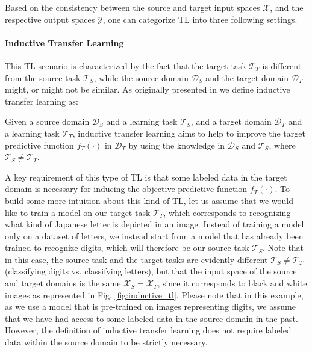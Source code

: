 Based on the consistency between the source and target input spaces $\mathcal{X}$, and the respective output spaces $\mathcal{Y}$, one can categorize TL into three following settings.

\paragraph{\textbf{\uppercase{I}nductive \uppercase{T}ransfer \uppercase{L}earning}}
This TL scenario is characterized by the fact that the target task $\mathcal{T}_T$ is different from the source task $\mathcal{T}_S$, while the source domain $\mathcal{D}_S$ and the target domain $\mathcal{D}_T$ might, or might not be similar. As originally presented in \cite{pan2009survey} we define inductive transfer learning as:
\begin{definition}
	Given a source domain $\mathcal{D}_S$ and a learning task $\mathcal{T}_S$, and a target domain $\mathcal{D}_T$ and a learning task $\mathcal{T}_T$, inductive transfer learning aims to help to improve the target predictive function $f_T(\cdot)$ in $\mathcal{D}_T$ by using the knowledge in $\mathcal{D}_S$ and $\mathcal{T}_S$, where $\mathcal{T}_S \neq \mathcal{T}_T$. 
\end{definition}
A key requirement of this type of TL is that some labeled data in the target domain is necessary for inducing the objective predictive function $f_T(\cdot)$. To build some more intuition about this kind of TL, let us assume that we would like to train a model on our target task $\mathcal{T}_T$, which corresponds to recognizing what kind of Japanese letter is depicted in an image. Instead of training a model only on a dataset of letters, we instead start from a model that has already been trained to recognize digits, which will therefore be our source task $\mathcal{T}_S$. Note that in this case, the source task and the target tasks are evidently different $\mathcal{T}_S \neq \mathcal{T}_T$ (classifying digits vs. classifying letters), but that the input space of the source and target domains is the same $\mathcal{X}_S = \mathcal{X}_T$, since it corresponds to black and white images as represented in Fig. \ref{fig:inductive_tl}. Please note that in this example, as we use a model that is pre-trained on images representing digits, we assume that we have had access to some labeled data in the source domain in the past. However, the definition of inductive transfer learning does not require labeled data within the source domain to be strictly necessary.

